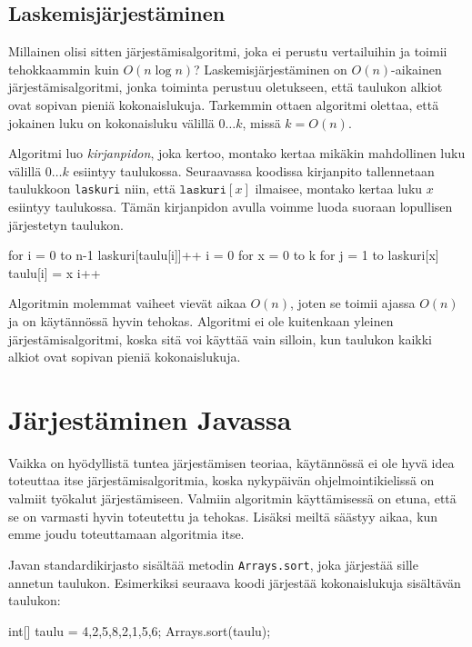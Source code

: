 \subsection{Laskemisjärjestäminen}

Millainen olisi sitten järjestämisalgoritmi,
joka ei perustu vertailuihin ja toimii
tehokkaammin kuin $O(n \log n)$?
Laskemisjärjestäminen on $O(n)$-aikainen järjestämisalgoritmi,
jonka toiminta perustuu oletukseen, että taulukon alkiot
ovat sopivan pieniä kokonaislukuja.
Tarkemmin ottaen algoritmi olettaa, että jokainen luku on
kokonaisluku välillä $0 \dots k$, missä $k=O(n)$.

Algoritmi luo \emph{kirjanpidon}, joka kertoo,
montako kertaa mikä\-kin mahdollinen luku välillä $0 \dots k$
esiintyy taulukossa.
Seuraavassa koodissa kirjanpito tallennetaan
taulukkoon \texttt{laskuri} niin, että
$\texttt{laskuri}[x]$ ilmaisee,
montako kertaa luku $x$ esiintyy taulukossa.
Tämän kirjanpidon avulla voimme luoda suoraan
lopullisen järjestetyn taulukon.

\begin{code}
for i = 0 to n-1
    laskuri[taulu[i]]++
i = 0
for x = 0 to k
    for j = 1 to laskuri[x]
        taulu[i] = x
        i++
\end{code}

Algoritmin molemmat vaiheet vievät aikaa $O(n)$,
joten se toimii ajassa $O(n)$ ja on käytännössä hyvin tehokas.
Algoritmi ei ole kuitenkaan yleinen järjestämisalgoritmi,
koska sitä voi käyttää vain silloin,
kun taulukon kaikki alkiot ovat sopivan pieniä kokonaislukuja.


\section{Järjestäminen Javassa}

Vaikka on hyödyllistä tuntea järjestämisen teoriaa,
käytännössä ei ole hyvä idea toteuttaa itse
järjestämisalgoritmia, koska nykypäivän ohjelmointikielissä
on valmiit työkalut järjestämiseen.
Valmiin algoritmin käyttämisessä on etuna,
että se on varmasti hyvin toteutettu ja tehokas.
Lisäksi meiltä säästyy aikaa, kun emme joudu
toteuttamaan algoritmia itse.

Javan standardikirjasto sisältää metodin \texttt{Arrays.sort},
joka järjestää sille annetun taulukon.
Esimerkiksi seuraava koodi järjestää kokonaislukuja
sisältävän taulukon:

\begin{code}
int[] taulu = {4,2,5,8,2,1,5,6};
Arrays.sort(taulu);
\end{code}

